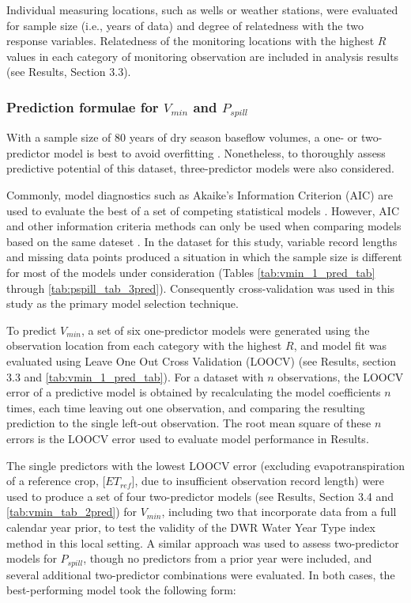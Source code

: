 \documentclass[hess, manuscript]{copernicus}
\begin{document}
Individual measuring locations, such as wells or weather stations, were
evaluated for sample size (i.e., years of data) and degree of
relatedness with the two response variables. Relatedness of the
monitoring locations with the highest \(R\) values in each category of
monitoring observation are included in analysis results (see Results,
Section 3.3).

\subsubsection{\texorpdfstring{Prediction formulae for \(V_{min}\) and
\(P_{spill}\)}{Prediction formulae for V\_\{min\} and P\_\{spill\}}}

With a sample size of 80 years of dry season baseflow volumes, a one- or
two-predictor model is best to avoid overfitting \citep{James2013}.
Nonetheless, to thoroughly assess predictive potential of this dataset,
three-predictor models were also considered.

Commonly, model diagnostics such as Akaike's Information Criterion (AIC)
are used to evaluate the best of a set of competing statistical models
\citep{Burnham2004}. However, AIC and other information criteria methods
can only be used when comparing models based on the same dateset
\citep{Burnham2004}. In the dataset for this study, variable record
lengths and missing data points produced a situation in which the sample
size is different for most of the models under consideration (Tables
\ref{tab:vmin_1_pred_tab} through \ref{tab:pspill_tab_3pred}).
Consequently cross-validation was used in this study as the primary
model selection technique.

To predict \(V_{min}\), a set of six one-predictor models were generated
using the observation location from each category with the highest
\(R\), and model fit was evaluated using Leave One Out Cross Validation
(LOOCV) \citep{James2013} (see Results, section 3.3 and
\autoref{tab:vmin_1_pred_tab}). For a dataset with \(n\) observations,
the LOOCV error of a predictive model is obtained by recalculating the
model coefficients \(n\) times, each time leaving out one observation,
and comparing the resulting prediction to the single left-out
observation. The root mean square of these \(n\) errors is the LOOCV
error used to evaluate model performance in Results.

The single predictors with the lowest LOOCV error (excluding
evapotranspiration of a reference crop, {[}\(ET_{ref}\){]}, due to
insufficient observation record length) were used to produce a set of
four two-predictor models (see Results, Section 3.4 and
\autoref{tab:vmin_tab_2pred}) for \(V_{min}\), including two that
incorporate data from a full calendar year prior, to test the validity
of the DWR Water Year Type index method in this local setting. A similar
approach was used to assess two-predictor models for \(P_{spill}\),
though no predictors from a prior year were included, and several
additional two-predictor combinations were evaluated. In both cases, the
best-performing model took the following form:
\end{document}

